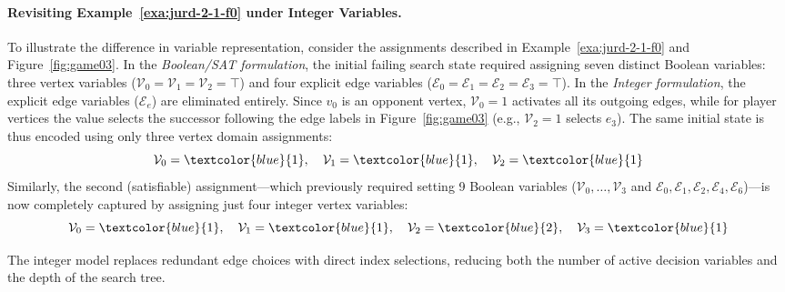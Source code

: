 \documentclass[a4paper,fleqn]{cas-sc}
\begin{document}
\paragraph{Revisiting Example~\ref{exa:jurd-2-1-f0} under Integer Variables.}
To illustrate the difference in variable representation, consider the assignments described in Example~\ref{exa:jurd-2-1-f0} and Figure~\ref{fig:game03}.  In the \textit{Boolean/SAT formulation}, the initial failing search state required assigning seven distinct Boolean variables: three vertex variables ($\mathcal{V}_0 = \mathcal{V}_1 = \mathcal{V}_2 = \top$) and four explicit edge variables ($\mathcal{E}_0 = \mathcal{E}_1 = \mathcal{E}_2 = \mathcal{E}_3 = \top$).  In the \textit{Integer formulation}, the explicit edge variables ($\mathcal{E}_e$) are eliminated entirely. Since $v_0$ is an opponent vertex, $\mathcal{V}_0 = 1$ activates all its outgoing edges, while for player vertices the value selects the successor following the edge labels in Figure~\ref{fig:game03} (e.g., $\mathcal{V}_2 = 1$ selects $e_3$). The same initial state is thus encoded using only three vertex domain assignments:
\[
    \mathcal{V}_0 = \textcolor{blue}{1}, \quad \mathcal{V}_1 = \textcolor{blue}{1}, \quad \mathcal{V}_2 = \textcolor{blue}{1}
\]
Similarly, the second (satisfiable) assignment—which previously required setting 9 Boolean variables ($\mathcal{V}_0, \dots, \mathcal{V}_3$ and $\mathcal{E}_0, \mathcal{E}_1, \mathcal{E}_2, \mathcal{E}_4, \mathcal{E}_6$)—is now completely captured by assigning just four integer vertex variables:
\[
    \mathcal{V}_0 = \textcolor{blue}{1}, \quad \mathcal{V}_1 = \textcolor{blue}{1}, \quad \mathcal{V}_2 = \textcolor{blue}{2}, \quad \mathcal{V}_3 = \textcolor{blue}{1}
\]

The integer model replaces redundant edge choices with direct index selections, reducing both the number of active decision variables and the depth of the search tree.
\end{document}
